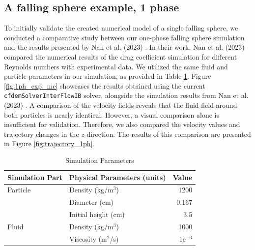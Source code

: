\subsection{A falling sphere example, 1 phase}
To initially validate the created numerical model of a single falling sphere, we conducted a comparative study between our one-phase falling sphere simulation and the results presented by Nan et al. (2023) \cite{nan2023high}. In their work, Nan et al. (2023) \cite{nan2023high} compared the numerical results of the drag coefficient simulation for different Reynolds numbers with experimental data. We utilized the same fluid and particle parameters in our simulation, as provided in Table \ref{table1-chap4_1}. Figure \ref{fig:1ph_exp_me} showcases the results obtained using the current \verb|cfdemSolverInterFlowIB| solver, alongside the simulation results from Nan et al. (2023) \cite{nan2023high}. A comparison of the velocity fields reveals that the fluid field around both particles is nearly identical. However, a visual comparison alone is insufficient for validation. Therefore, we also compared the velocity values and trajectory changes in the $z$-direction. The results of this comparison are presented in Figure \ref{fig:trajectory_1ph}.

\begin{table}[H]
    \centering
    \caption{Simulation Parameters} \label{table1-chap4_1}
    \begin{tabular}{llr}
        \toprule
        \hline
        Simulation Part         & Physical Parameters (units) & Value \\
        \hline
        \midrule
        Particle                 & Density (kg/m$^3$)          & 1200    \\
                         & Diameter (cm)          & 0.167    \\
                         & Initial height (cm)          & 3.5    \\
                         \hline
        Fluid                  & Density (kg/m$^3$)           & 1000   \\
                                & Viscosity (m$^2$/s)         & 1e$^{-6}$    \\
                                \hline
        \bottomrule
     \end{tabular}
\end{table}
%

